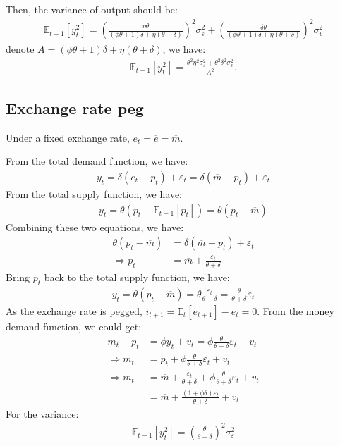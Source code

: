 \documentclass[a4paper,12pt]{article} %
\theoremstyle{nonitalic}
\begin{document}
Then, the variance of output should be:
\begin{gather*}
    \mathbb{E}_{t-1}[y_t^2] = \left( \frac{\eta \theta}{(\phi \theta + 1)\delta + \eta (\theta + \delta)}\right)^2 \sigma_{\varepsilon}^2 + \left( \frac{\delta \theta}{(\phi \theta + 1)\delta + \eta (\theta + \delta)} \right)^2 \sigma_v^2
\end{gather*}
denote $A = (\phi \theta + 1)\delta + \eta (\theta + \delta)$, we have:
\begin{gather*}
    \mathbb{E}_{t-1}[y_t^2] = \frac{\theta^2 \eta^2 \sigma_{\varepsilon}^2 + \theta^2 \delta^2 \sigma_v^2}{A^2}.
\end{gather*}

\subsection{Exchange rate peg}

Under a fixed exchange rate, $e_t = \overline{e} = \overline{m} $.

From the total demand function, we have:
\begin{gather*}
    y_t = \delta (e_t - p_t) + \varepsilon_t = \delta (\overline{m} - p_t) + \varepsilon_t
\end{gather*}
From the total supply function, we have:
\begin{gather*}
    y_t = \theta (p_t - \mathbb{E}_{t-1}[p_t]) = \theta (p_t - \overline{m}) 
\end{gather*}
Combining these two equations, we have:
\begin{align*}
    \theta (p_t - \overline{m}) &= \delta (\overline{m} - p_t) + \varepsilon_t \\
    \Rightarrow p_t &= \overline{m} + \frac{\varepsilon_t}{\theta + \delta}   
\end{align*}
Bring $p_t$ back to the total supply function, we have:
\begin{gather*}
    y_t = \theta (p_t - \overline{m}) = \theta \frac{\varepsilon_t}{\theta + \delta} = \frac{\theta}{\theta + \delta} \varepsilon_t 
\end{gather*}
As the exchange rate is pegged, $i_{t+1} = \mathbb{E}_t[e_{t+1}] - e_t = 0$.
From the money demand function, we could get:
\begin{align*}
    m_t - p_t &= \phi y_t + v_t = \phi \frac{\theta}{\theta + \delta} \varepsilon_t + v_t \\
    \Rightarrow m_t &= p_t + \phi \frac{\theta}{\theta + \delta} \varepsilon_t + v_t \\
    \Rightarrow m_t &= \overline{m} + \frac{\varepsilon_t}{\theta + \delta} + \phi \frac{\theta}{\theta + \delta} \varepsilon_t + v_t \\
    &= \overline{m} + \frac{(1 + \phi \theta) \varepsilon_t}{\theta + \delta} + v_t
\end{align*}
For the variance:
\begin{gather*}
    \mathbb{E}_{t-1}[y_t^2] = \left( \frac{\theta}{\theta + \delta} \right)^2 \sigma_{\varepsilon}^2
\end{gather*}
\end{document}
